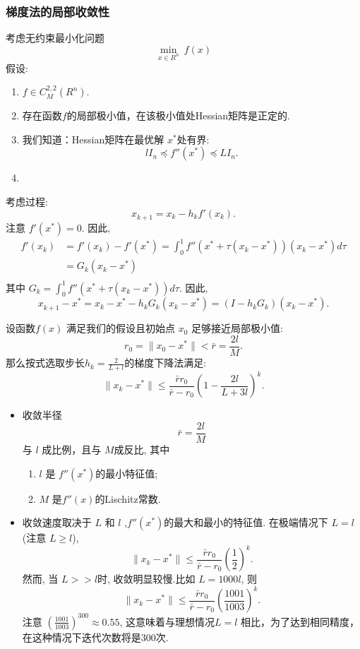 \documentclass[handout]{beamer}
\begin{document}
\begin{frame}[allowframebreaks]
\frametitle{ 梯度法的局部收敛性}


考虑无约束最小化问题
$$
    \min_{x\in R^n} \ f(x)
$$
 假设:
\begin{enumerate}
    \item $f\in C_M^{2,2}(R^n)$.
    \item 存在函数$f$的局部极小值，在该极小值处Hessian矩阵是正定的.
    \item 我们知道：Hessian矩阵在最优解 $x^*$处有界:
    \begin{equation}\label{EQ_1_2_17}
        l I_n \preceq f''(x^*) \preceq L I_n.
    \end{equation}
    \item {}
\end{enumerate}

\framebreak

考虑过程:
$$
    x_{k+1}^{} = x_k - h_k f'(x_k).
$$
注意 $f'(x^*) = 0$. 因此,
$$
\begin{aligned}
    f'(x_k)    & =f'(x_k) - f'(x^*) = \int_{0}^{1} f''(x^* + \tau(x_k-x^*)) (x_k-x^*) d\tau \\
        & =G_k (x_k-x^*) \\
\end{aligned}
$$
其中 $G_k = \int_0^1 f''(x^* + \tau(x_k-x^*)) d\tau$. 因此,
$$
    x_{k+1}^{} - x^* = x_k - x^* - h_{k}^{}G_k^{}(x_k-x^*) = (I-h_kG_k) (x_k-x^*).
$$

\framebreak


\begin{theorem}\label{TH_1_2_4}
    设函数$f(x)$ 满足我们的假设且初始点 $x_0$ 足够接近局部极小值:
    $$
        r_0 = \|x_0 - x^* \| < \bar{r} = \frac{2l}{M}.
    $$
    那么按式选取步长$h_k = \frac{2}{L+l}$的梯度下降法满足:
    $$
    \|x_k - x^*\| \leq \frac{\bar{r}r_0}{\bar{r}-r_0} \left(1-\frac{2l}{L+3l} \right)^k.
    $$
\end{theorem}


\framebreak

\begin{itemize}
\item 收敛半径
        $$
            \bar{r} = \frac{2l}{M}
        $$
        与 $l$ 成比例，且与 $M$成反比, 其中
        \begin{enumerate}
        \item $l$ 是 $f''(x^*)$的最小特征值;
        \item $M$  是$f''(x)$的Lischitz常数.
        \end{enumerate}

\item 收敛速度取决于 $L$ 和 $l$ ,$f''(x^*)$的最大和最小的特征值.
在极端情况下 $L = l$ (注意 $L\geq l$),
      $$
    \|x_k - x^*\| \leq \frac{\bar{r}r_0}{\bar{r}-r_0}  (\frac{1}{2})^k.
    $$
然而, 当 $L>>l$时, 收敛明显较慢.比如 $L = 1000 l$, 则
      $$
    \|x_k - x^*\| \leq \frac{\bar{r}r_0}{\bar{r}-r_0}  (\frac{1001}{1003})^k.
    $$
注意 $(\frac{1001}{1003})^{300} \approx 0.55$, 这意味着与理想情况$L = l$ 相比，为了达到相同精度，在这种情况下迭代次数将是300次.
\end{itemize}
\end{frame}
\end{document}
